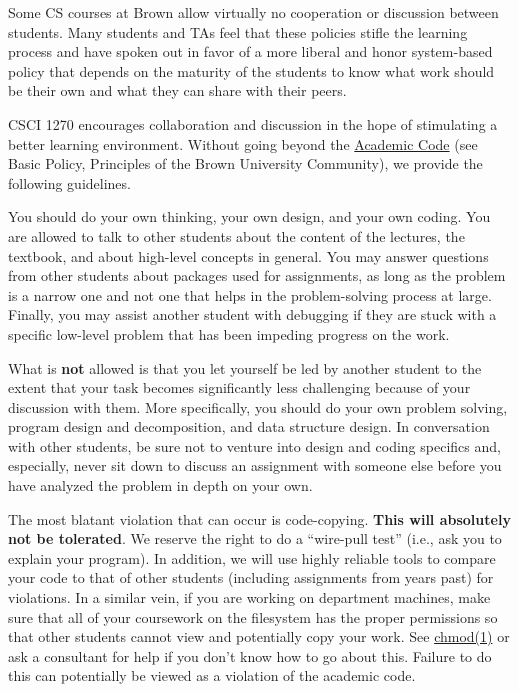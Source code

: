 \documentclass{article}
\begin{document}
Some CS courses at Brown allow virtually no cooperation or discussion between students. Many students and TAs feel that these policies stifle the learning process and have spoken out in favor of a more liberal and honor system-based policy that depends on the maturity of the students to know what work should be their own and what they can share with their peers.

CSCI 1270 encourages collaboration and discussion in the hope of stimulating a better learning environment. Without going beyond the \href{https://www.brown.edu/academics/college/degree/policies/academic-code}{Academic Code} (see Basic Policy, Principles of the Brown University Community), we provide the following guidelines.

You should do your own thinking, your own design, and your own coding. You are allowed to talk to other students about the content of the lectures, the textbook, and about high-level concepts in general. You may answer questions from other students about packages used for assignments, as long as the problem is a narrow one and not one that helps in the problem-solving process at large. Finally, you may assist another student with debugging if they are stuck with a specific low-level problem that has been impeding progress on the work.

What is \textbf{not} allowed is that you let yourself be led by another student to the extent that your task becomes significantly less challenging because of your discussion with them.
More specifically, you should do your own problem solving, program design and decomposition, and data structure design. In conversation with other students, be sure not to venture into design and coding specifics and, especially, never sit down to discuss an assignment with someone else before you have analyzed the problem in depth on your own.

The most blatant violation that can occur is code-copying. \textbf{This will absolutely not be tolerated}. We reserve the right to do a ``wire-pull test'' (i.e., ask you to explain your program). In addition, we will use highly reliable tools to compare your code to that of other students (including assignments from years past) for violations. In a similar vein, if you are working on department machines, make sure that all of your coursework on the filesystem has the proper permissions so that other students cannot view and potentially copy your work. See \href{https://linux.die.net/man/1/chmod}{chmod(1)} or ask a consultant for help if you don’t know how to go about this. Failure to do this can potentially be viewed as a violation of the academic code.
\end{document}
